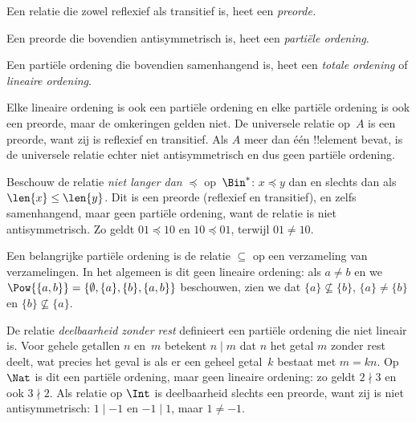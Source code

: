 \documentclass[openany]{memoir}
\begin{document}
\begin{defn}[Preorde]
Een relatie die zowel reflexief als transitief is, heet een
\emph{preorde.}  
\end{defn}

\begin{defn}
Een preorde die bovendien antisymmetrisch is, heet een
\emph{partiële ordening}.
\end{defn}

\begin{defn}
Een partiële ordening die bovendien samenhangend is, heet een
\emph{totale ordening} of \emph{lineaire ordening}.
\end{defn}

\begin{ex}
Elke lineaire ordening is ook een partiële ordening en elke partiële ordening is
ook een preorde, maar de omkeringen gelden niet. De universele relatie
op~$A$ is een preorde, want zij is reflexief en transitief. Als
$A$ meer dan één !!{element} bevat, is de universele relatie echter niet
antisymmetrisch en dus geen partiële ordening.
\end{ex}

\begin{ex}
Beschouw de relatie \emph{niet langer dan} $\preccurlyeq$ op~$\Bin^*$:
$x \preccurlyeq y$ dan en slechts dan als $\len{x} \le \len{y}$. Dit is een
preorde (reflexief en transitief), en zelfs samenhangend, maar geen partiële
ordening, want de relatie is niet antisymmetrisch. Zo geldt $01
\preccurlyeq 10$ en $10 \preccurlyeq 01$, terwijl $01 \neq 10$.
\end{ex}

\begin{ex}
Een belangrijke partiële ordening is de relatie $\subseteq$ op een verzameling
van verzamelingen. In het algemeen is dit geen lineaire ordening: als $a \neq b$
en we $\Pow{\{a, b\}} = \{\emptyset, \{a\}, \{b\}, \{a,b\}\}$ beschouwen,
zien we dat $\{a\} \nsubseteq \{b\}$, $\{a\} \neq \{b\}$ en $\{b\}
\nsubseteq \{a\}$.
\end{ex}

\begin{ex}
De relatie \emph{deelbaarheid zonder rest} definieert een partiële ordening die
niet lineair is. Voor gehele getallen $n$ en~$m$ betekent $n \mid m$ dat $n$
het getal $m$ zonder rest deelt, wat precies het geval is als er een geheel
getal~$k$ bestaat met $m = kn$. Op~$\Nat$ is dit een partiële
ordening, maar geen lineaire ordening: zo geldt $2 \nmid 3$ en ook $3 \nmid
2$. Als relatie op $\Int$ is deelbaarheid slechts een preorde, want zij is niet
antisymmetrisch: $1 \mid -1$ en $-1 \mid 1$, maar $1 \neq -1$.
\end{ex}
\end{document}
